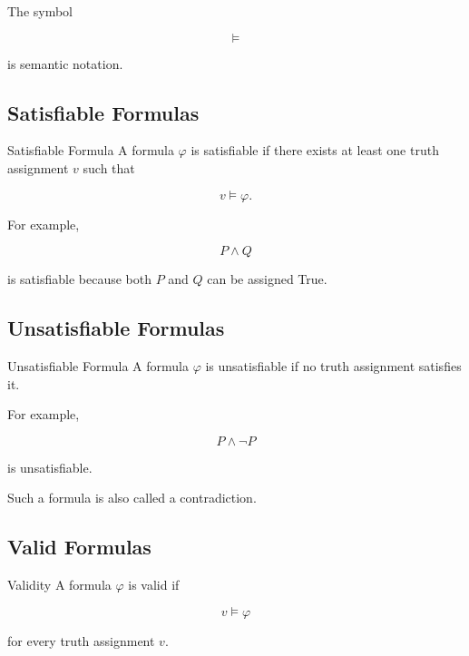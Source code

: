 The symbol

\[
\models
\]

is semantic notation.

\subsection{Satisfiable Formulas}
\label{subsec:satisfiable-formulas}

\begin{definitionbox}{Satisfiable Formula}
A formula \(\varphi\) is satisfiable if there exists at least one truth
assignment \(v\) such that

\[
v\models\varphi.
\]
\end{definitionbox}

For example,

\[
P\land Q
\]

is satisfiable because both \(P\) and \(Q\) can be assigned True.

\subsection{Unsatisfiable Formulas}
\label{subsec:unsatisfiable-formulas}

\begin{definitionbox}{Unsatisfiable Formula}
A formula \(\varphi\) is unsatisfiable if no truth assignment satisfies it.
\end{definitionbox}

For example,

\[
\boxed{
P\land\neg P
}
\]

is unsatisfiable.

Such a formula is also called a contradiction.

\subsection{Valid Formulas}
\label{subsec:valid-formulas}

\begin{definitionbox}{Validity}
A formula \(\varphi\) is valid if

\[
v\models\varphi
\]

for every truth assignment \(v\).
\end{definitionbox}

